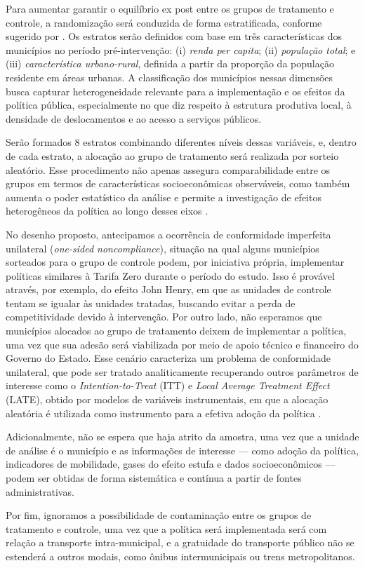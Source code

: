 Para aumentar garantir o equilíbrio ex post entre os grupos de tratamento e controle, a randomização será conduzida de forma estratificada, conforme sugerido por . Os estratos serão definidos com base em três características dos municípios no período pré-intervenção: (i) \textit{renda per capita}; (ii) \textit{população total}; e (iii) \textit{característica urbano-rural}, definida a partir da proporção da população residente em áreas urbanas. A classificação dos municípios nessas dimensões busca capturar heterogeneidade relevante para a implementação e os efeitos da política pública, especialmente no que diz respeito à estrutura produtiva local, à densidade de deslocamentos e ao acesso a serviços públicos.

Serão formados 8 estratos combinando diferentes níveis dessas variáveis, e, dentro de cada estrato, a alocação ao grupo de tratamento será realizada por sorteio aleatório. Esse procedimento não apenas assegura comparabilidade entre os grupos em termos de características socioeconômicas observáveis, como também aumenta o poder estatístico da análise e permite a investigação de efeitos heterogêneos da política ao longo desses eixos \cite{duflo2008toolkit, angrist2009mostly}.

No desenho proposto, antecipamos a ocorrência de conformidade imperfeita unilateral (\textit{one-sided noncompliance}), situação na qual alguns municípios sorteados para o grupo de controle podem, por iniciativa própria, implementar políticas similares à Tarifa Zero durante o período do estudo. Isso é provável através, por exemplo, do efeito John Henry, em que as unidades de controle tentam se igualar às unidades tratadas, buscando evitar a perda de competitividade devido à intervenção. Por outro lado, não esperamos que municípios alocados ao grupo de tratamento deixem de implementar a política, uma vez que sua adesão será viabilizada por meio de apoio técnico e financeiro do Governo do Estado. Esse cenário caracteriza um problema de conformidade unilateral, que pode ser tratado analiticamente recuperando outros parâmetros de interesse como o \textit{Intention-to-Treat} (ITT) e \textit{Local Average Treatment Effect} (LATE), obtido por modelos de variáveis instrumentais, em que a alocação aleatória é utilizada como instrumento para a efetiva adoção da política \cite{duflo2008toolkit,glewwe2022impact,
angrist2009mostly}.

Adicionalmente, não se espera que haja atrito da amostra, uma vez que a unidade de análise é o município e as informações de interesse — como adoção da política, indicadores de mobilidade, gases do efeito estufa e dados socioeconômicos — podem ser obtidas de forma sistemática e contínua a partir de fontes administrativas. 

Por fim, ignoramos a possibilidade de contaminação entre os grupos de tratamento e controle, uma vez que a política será implementada será com relação a transporte intra-municipal, e a gratuidade do transporte público não se estenderá a outros modais, como ônibus intermunicipais ou trens metropolitanos. 

